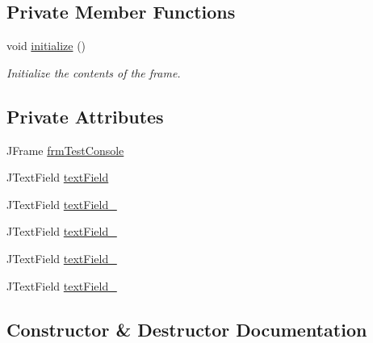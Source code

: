 \subsection*{Private Member Functions}
\begin{DoxyCompactItemize}
\item 
void \hyperlink{classWaysideController_1_1testPopUp_a70581bc9a4295357f7a7ad313c6a0568}{initialize} ()
\begin{DoxyCompactList}\small\item\em Initialize the contents of the frame. \end{DoxyCompactList}\end{DoxyCompactItemize}
\subsection*{Private Attributes}
\begin{DoxyCompactItemize}
\item 
J\+Frame \hyperlink{classWaysideController_1_1testPopUp_ab508198c90a80563589466ef9e44d97e}{frm\+Test\+Console}
\item 
J\+Text\+Field \hyperlink{classWaysideController_1_1testPopUp_a514c5f48db1808eb635d27a88533964e}{text\+Field}
\item 
J\+Text\+Field \hyperlink{classWaysideController_1_1testPopUp_a4132217526e4a0f097cf97c2f5673709}{text\+Field\+\_}
\item 
J\+Text\+Field \hyperlink{classWaysideController_1_1testPopUp_a87ff222532769e488dee14997c260e16}{text\+Field\+\_}
\item 
J\+Text\+Field \hyperlink{classWaysideController_1_1testPopUp_ad354a48b6af395820d0edea84f8269d8}{text\+Field\+\_}
\item 
J\+Text\+Field \hyperlink{classWaysideController_1_1testPopUp_af541d3ad7b2176e774fe32456d440ec9}{text\+Field\+\_}
\end{DoxyCompactItemize}


\subsection{Constructor \& Destructor Documentation}
\mbox{\label{classWaysideController_1_1testPopUp_aca786bae3886bcc67ee27de840713e80}} 
